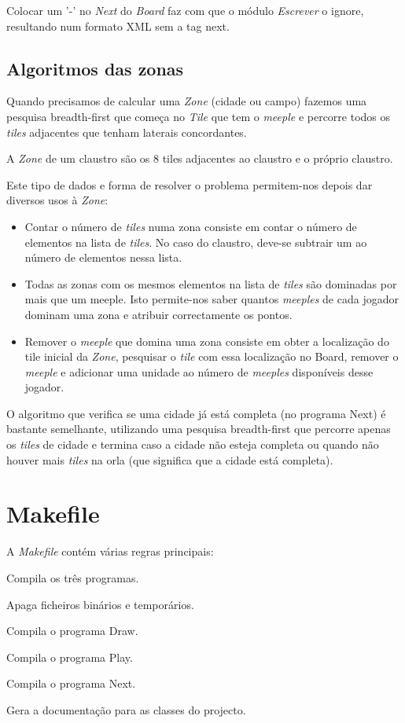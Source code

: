\documentclass[11pt, a4paper, twoside]{article}
\begin{document}
Colocar um '-' no \emph{Next} do \emph{Board} faz com que o módulo \emph{Escrever} o ignore, resultando num formato XML sem a tag next.

\newpage
\subsection{Algoritmos das zonas}
Quando precisamos de calcular uma \emph{Zone} (cidade ou campo) fazemos uma pesquisa breadth-first que começa no \emph{Tile} que tem o \emph{meeple} e percorre todos os \emph{tiles} adjacentes que tenham laterais concordantes.

A \emph{Zone} de um claustro são os 8 tiles adjacentes ao claustro e o próprio claustro.

Este tipo de dados e forma de resolver o problema permitem-nos depois dar diversos usos à \emph{Zone}:

\begin{itemize}
  \item Contar o número de \emph{tiles} numa zona consiste em contar o número de elementos na lista de \emph{tiles}. No caso do claustro, deve-se subtrair um ao número de elementos nessa lista.
  \item Todas as zonas com os mesmos elementos na lista de \emph{tiles} são dominadas por mais que um meeple. Isto permite-nos saber quantos \emph{meeples} de cada jogador dominam uma zona e atribuir correctamente os pontos.
  \item Remover o \emph{meeple} que domina uma zona consiste em obter a localização do tile inicial da \emph{Zone}, pesquisar o \emph{tile} com essa localização no Board, remover o \emph{meeple} e adicionar uma unidade ao número de \emph{meeples} disponíveis desse jogador.
\end{itemize}

O algoritmo que verifica se uma cidade já está completa (no programa Next) é bastante semelhante, utilizando uma pesquisa breadth-first que percorre apenas os \emph{tiles} de cidade e termina caso a cidade não esteja completa ou quando não houver mais \emph{tiles} na orla (que significa que a cidade está completa).

\newpage
\section{Makefile}
A \emph{Makefile} contém várias regras principais:

\begin{description}[style=multiline,leftmargin=2cm,font=\bfseries]
    \item[all] Compila os três programas.
    \item[clean] Apaga ficheiros binários e temporários.
    \item[draw] Compila o programa Draw.
    \item[play] Compila o programa Play.
    \item[next] Compila o programa Next.
    \item[doc] Gera a documentação para as classes do projecto.
\end{description}
\end{document}
